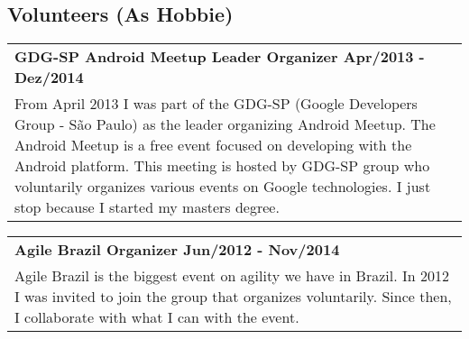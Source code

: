 \documentclass[a4paper, oneside, final]{scrartcl}
\newcommand{\vspc}{\vspace{0.15cm}} %
\begin{document}
\begin{center}


\section{Volunteers (As Hobbie)}
\begin{tabularx}{1\linewidth}{X}
{\bf GDG-SP Android Meetup Leader Organizer \hfill Apr/2013 - Dez/2014} \\
From April 2013 I was part of the GDG-SP (Google Developers Group - São Paulo) as the leader organizing Android Meetup. The Android Meetup is a free event focused on developing with the Android platform. This meeting is hosted by GDG-SP group who voluntarily organizes various events on Google technologies. I just stop because I started my masters degree. \vspc\\
\end{tabularx}

\begin{tabularx}{1\linewidth}{X}
{\bf Agile Brazil Organizer \hfill Jun/2012 - Nov/2014} \\
Agile Brazil is the biggest event on agility we have in Brazil. In 2012 I was invited to join the group that organizes voluntarily. Since then, I collaborate with what I can with the event. \vspc\\
\end{tabularx}


\end{center}
\end{document}
